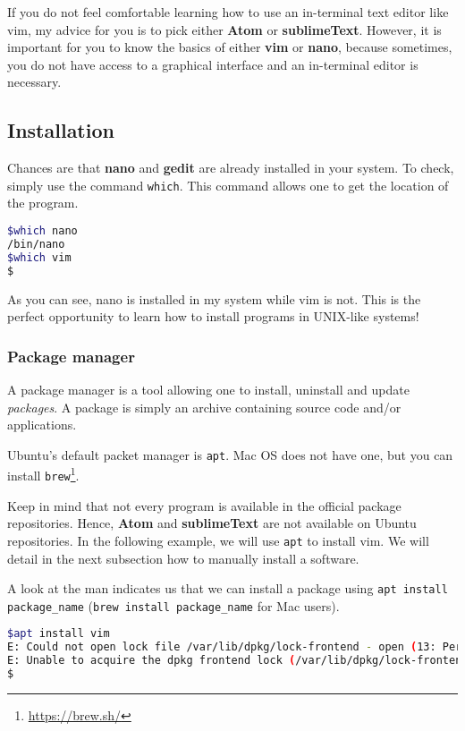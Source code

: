 \documentclass[12pt]{article}
\begin{document}
If you do not feel comfortable learning how to use an in-terminal text editor like vim, my advice for you is to pick either \textbf{Atom} or \textbf{sublimeText}.
However, it is important for you to know the basics of either \textbf{vim} or \textbf{nano}, because sometimes, you do not have access to a graphical interface and an in-terminal editor is necessary.

\subsection{Installation}

Chances are that \textbf{nano} and \textbf{gedit} are already installed in your system. To check, simply use the command \texttt{which}. This command allows one to get the location of the program.

\begin{lstlisting}[language=bash]
$which nano
/bin/nano
$which vim
$
\end{lstlisting}

As you can see, nano is installed in my system while vim is not.
This is the perfect opportunity to learn how to install programs in UNIX-like systems!

\subsubsection{Package manager}

A package manager is a tool allowing one to install, uninstall and update \textit{packages}.
A package is simply an archive containing source code and/or applications.

Ubuntu's default packet manager is \texttt{apt}. Mac OS does not have one, but you can install \texttt{brew}\footnote{\url{https://brew.sh/}}.

Keep in mind that not every program is available in the official package repositories. Hence, \textbf{Atom} and \textbf{sublimeText} are not available on Ubuntu repositories. In the following example, we will use \texttt{apt} to install vim. We will detail in the next subsection how to manually install a software.

A look at the man indicates us that we can install a package using \texttt{apt install package\_name} (\texttt{brew install package\_name} for Mac users).

\begin{lstlisting}[language=bash]
$apt install vim
E: Could not open lock file /var/lib/dpkg/lock-frontend - open (13: Permission denied)
E: Unable to acquire the dpkg frontend lock (/var/lib/dpkg/lock-frontend), are you root?
$
\end{lstlisting}
\end{document}

